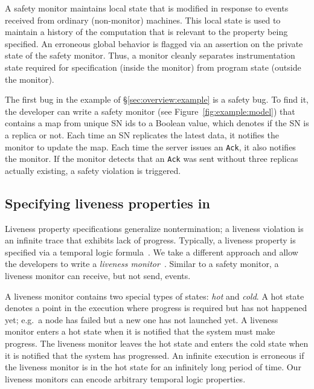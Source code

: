 A safety monitor maintains local state that is modified in response to events received from ordinary (non-monitor) machines. This local state is used to maintain a history of the computation that is relevant to the property being specified. An erroneous global behavior is flagged via an assertion on the private state of the safety monitor. Thus, a monitor cleanly separates instrumentation state required for specification (inside the monitor) from program state (outside the monitor).

The first bug in the example of \S\ref{sec:overview:example} is a safety bug. To find it, the developer can write a safety monitor (see Figure~\ref{fig:example:model}) that contains a map from unique SN ids to a Boolean value, which denotes if the SN is a replica or not. Each time an SN replicates the latest data, it notifies the monitor to update the map. Each time the server issues an \texttt{Ack}, it also notifies the monitor. If the monitor detects that an \texttt{Ack} was sent without three replicas actually existing, a safety violation is triggered.

\vspace{-1mm}
\subsection{Specifying liveness properties in \psharp}
\label{sec:overview:liveness}

Liveness property specifications generalize nontermination; a liveness violation is an infinite trace that exhibits lack of progress. Typically, a liveness property is specified via a temporal logic formula~\cite{Pnueli1977, lamport1994temporal}. We take a different approach and allow the developers to write a \emph{liveness monitor}~\cite{desai2015building}. Similar to a safety monitor, a liveness monitor can receive, but not send, events.

A liveness monitor contains two special types of states: \emph{hot} and \emph{cold}. A hot state denotes a point in the execution where progress is required but has not happened yet; e.g.\ a node has failed but a new one has not launched yet. A liveness monitor enters a hot state when it is notified that the system must make progress. The liveness monitor leaves the hot state and enters the cold state when it is notified that the system has progressed. An infinite execution is erroneous if the liveness monitor is in the hot state for an infinitely long period of time. Our liveness monitors can encode arbitrary temporal logic properties.

